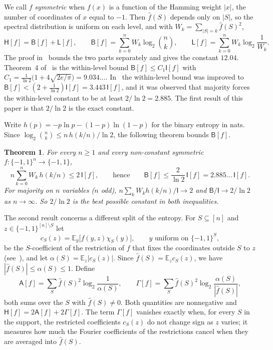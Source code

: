 \documentclass[11pt]{amsart}
\newtheorem{mainthm}{Theorem}
\theoremstyle{remark}
\newcommand{\bits}{\{-1,1\}}
\newcommand{\E}{\mathbb E}
\newcommand{\HH}{\mathsf H}
\newcommand{\I}{\mathsf I}
\newcommand{\wh}[1]{\widehat{#1}}
\begin{document}
We call $f$ \emph{symmetric} when $f(x)$ is a function of the Hamming weight $|x|$, the number of coordinates of $x$ equal to $-1$. Then $\wh f(S)$ depends only on $|S|$, so the spectral distribution is uniform on each level, and with $W_k=\sum_{|S|=k}\wh f(S)^2$,
\begin{equation}\label{eq:split}
 \HH[f]=\mathsf B[f]+\mathsf L[f],\qquad \mathsf B[f]=\sum_{k=0}^nW_k\log_2\binom nk,\qquad \mathsf L[f]=\sum_{k=0}^nW_k\log_2\frac1{W_k}.
\end{equation}
The proof in~\cite{OWZ11} bounds the two parts separately and gives the constant $12.04$. Theorem~4 of~\cite{OWZ11} is the within-level bound $\mathsf B[f]\le C_1\I[f]$ with $C_1=\frac1{\ln2}\bigl(1+4\sqrt{2e/\pi}\bigr)=9.034\dots$. In~\cite{Shm26b} the within-level bound was improved to $\mathsf B[f]<(2+\frac1{\ln2})\I[f]=3.443\,\I[f]$, and it was observed that majority forces the within-level constant to be at least $2/\ln2=2.885$. The first result of this paper is that $2/\ln2$ is the exact constant.

Write $h(p)=-p\ln p-(1-p)\ln(1-p)$ for the binary entropy in nats. Since $\log_2\binom nk\le n\,h(k/n)/\ln2$, the following theorem bounds $\mathsf B[f]$.

\begin{mainthm}\label{thm:A}
For every $n\ge1$ and every non-constant symmetric $f:\bits^n\to\bits$,
\[
 n\sum_{k=0}^nW_k\,h(k/n)\le2\,\I[f],\qquad\text{hence}\qquad \mathsf B[f]\le\frac{2}{\ln2}\,\I[f]=2.885\dots\,\I[f].
\]
For majority on $n$ variables ($n$ odd), $n\sum_kW_kh(k/n)/\I\to2$ and $\mathsf B/\I\to2/\ln2$ as $n\to\infty$. So $2/\ln2$ is the best possible constant in both inequalities.
\end{mainthm}

The second result concerns a different split of the entropy. For $S\subseteq[n]$ and $z\in\bits^{[n]\setminus S}$ let
\[
 c_S(z)=\E_{y}\bigl[f(y,z)\chi_S(y)\bigr],\qquad y\text{ uniform on }\bits^S,
\]
be the $S$-coefficient of the restriction of $f$ that fixes the coordinates outside $S$ to $z$ (see~\cite[Section~3.3]{OD14}), and let $\alpha(S)=\E_z|c_S(z)|$. Since $\wh f(S)=\E_zc_S(z)$, we have $|\wh f(S)|\le\alpha(S)\le1$. Define
\[
 \mathsf A[f]=\sum_S\wh f(S)^2\log_2\frac1{\alpha(S)},\qquad
 \Gamma[f]=\sum_S\wh f(S)^2\log_2\frac{\alpha(S)}{|\wh f(S)|},
\]
both sums over the $S$ with $\wh f(S)\ne0$. Both quantities are nonnegative and $\HH[f]=2\mathsf A[f]+2\Gamma[f]$. The term $\Gamma[f]$ vanishes exactly when, for every $S$ in the support, the restricted coefficients $c_S(z)$ do not change sign as $z$ varies; it measures how much the Fourier coefficients of the restrictions cancel when they are averaged into $\wh f(S)$.
\end{document}
